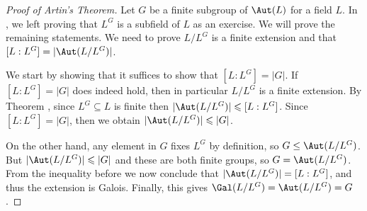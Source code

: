 \documentclass[12pt]{amsart}
\theoremstyle{definition}
\numberwithin{equation}{theorem}
\begin{document}
\begin{proof}[Proof of Artin's Theorem] 
Let $G$ be a finite subgroup of $\Aut(L)$ for a field $L$. In , we left proving that $L^G$ is a subfield of $L$ as an exercise. We will prove the remaining statements. We need to prove $L/L^G$ is a finite extension and that $[L:L^G] = |\Aut(L/L^G)|$.

We start by showing that it suffices to show that $[L: L^G] = |G|$. If $[L: L^G] = |G|$ does indeed hold, then in particular $L/L^G$ is a finite extension. By Theorem , since $L^G \subseteq L$ is finite then $|\Aut(L/L^G)| \leqslant [L:L^G]$. Since $[L: L^G] = |G|$, then we obtain $|\Aut(L/L^G)| \leqslant |G|$.

On the other hand, any element in $G$ fixes $L^G$ by definition, so $G \leq \Aut(L/L^G)$. But $|\Aut(L/L^G)| \leqslant |G|$ and these are both finite groups, so $G = \Aut(L/L^G)$. From the inequality before we now conclude that $|\Aut(L/L^G)| = [L:L^G]$, and thus the extension is Galois. Finally, this gives $\Gal(L/L^G) = \Aut(L/L^G) = G$.



\end{proof}
\end{document}
